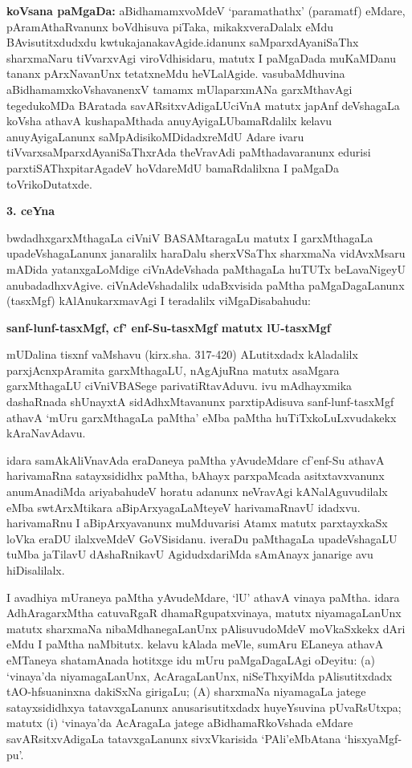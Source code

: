 {\bf koVsana paMgaDa:} aBidhamamxvoMdeV `paramathathx' (paramatf) eMdare, pAramAthaR\break\-vanunx boVdhisuva piTaka, mikakxveraDalalx eMdu BAvisutitxdudxdu kwtukajanakavAgide.\break idanunx saMparxdAyaniSaThx sharxmaNaru tiVvarxvAgi viroVdhisidaru, matutx I paMgaDada muKaMDanu tananx pArxNavanUnx tetatxneMdu heVLalAgide. vasubaMdhuvina aBidhamamxkoVshavanenxV tamamx mUlaparxmANa garxMthavAgi tegedukoMDa BAratada savARsitxvAdigaLU\break ciVnA matutx japAnf deVshagaLa koVsha athavA  kushapaMthada anuyAyigaLU\break bamaRdalilx kelavu anuyAyigaLanunx saMpAdisikoMDidadxreMdU Adare ivaru tiVvarx\-saMparxdAyaniSaThxrAda theVravAdi paMthadavaranunx edurisi parxtiSAThxpitarAgadeV hoVda\-reMdU bamaRdalilxna I paMgaDa toVrikoDutatxde.

\begin{center}
{\textbf{\Large 3. ceYna}}
\end{center}

bwdadhxgarxMthagaLa ciVniV BASAMtaragaLu matutx I garxMthagaLa upadeVshagaLanunx janaralilx haraDalu sherxVSaThx sharxmaNa vidAvxMsaru mADida yatanxgaLoMdige ciVnAdeVshada paMthagaLa huTUTx beLavaNigeyU anubadadhxvAgive. ciVnAdeVshadalilx udaBxvisida paMtha paMgaDagaLanunx (tasxMgf) kAlAnukarxmavAgi I teradalilx viMgaDisabahudu:

\begin{center}
{\textbf{\Large sanf-lunf-tasxMgf, cf' enf-Su-tasxMgf matutx lU-tasxMgf}}
\end{center}

mUDalina tisxnf vaMshavu (kirx.sha. 317-420) ALutitxdadx kAladalilx parxjAcnxpAramita garxMthagaLU, nAgAjuRna matutx asaMgara garxMthagaLU ciVniVBASege parivatiRtavAduvu. ivu mAdhayxmika dashaRnada shUnayxtA sidAdhxMtavanunx parxtipAdisuva sanf-lunf-tasxMgf athavA `mUru garxMthagaLa paMtha' eMba paMtha huTiTxkoLuLxvudakekx kAraNavAdavu. 

idara samAkAliVnavAda eraDaneya paMtha yAvudeMdare cf'enf-Su athavA harivamaRna satayxsididhx paMtha, bAhayx parxpaMcada asitxtavxvanunx anumAnadiMda ariyabahudeV horatu adanunx neVravAgi kANalAguvudilalx eMba swtArxMtikara aBipArxyagaLaMteyeV harivamaRnavU idadxvu. harivamaRnu I aBipArxyavanunx muMduvarisi Atamx matutx parxtayxkaSx loVka eraDU ilalxveMdeV GoVSisidanu. iveraDu paMthagaLa upadeVshagaLU tuMba jaTilavU dAshaRnikavU AgidudxdariMda sAmAnayx janarige avu hiDisalilalx.

I avadhiya mUraneya paMtha yAvudeMdare, `lU' athavA vinaya paMtha. idara AdhAragarxMtha catuvaRgaR dhamaRgupatxvinaya, matutx niyamagaLanUnx matutx sharxmaNa nibaMdhanegaLanUnx pAlisuvudoMdeV moVkaSxkekx dAri eMdu I paMtha naMbitutx. kelavu kAlada meVle, sumAru ELaneya athavA eMTaneya shatamAnada hotitxge idu mUru paMgaDagaLAgi oDeyitu: (a) `vinaya'da niyamagaLanUnx, AcAragaLanUnx, niSeThxyiMda pAlisutitxdadx tAO-hfsuaninxna dakiSxNa girigaLu; (A) sharxmaNa niyamagaLa jatege satayxsididhxya tatavxgaLanunx anusarisutitxdadx huyeYsuvina pUvaRsUtxpa; matutx (i) `vinaya'da AcAragaLa jatege aBidhamaRkoVshada eMdare savARsitxvAdigaLa tatavxgaLanunx sivxVkarisida `PAli'eMbAtana `hisxyaMgf-pu'.


